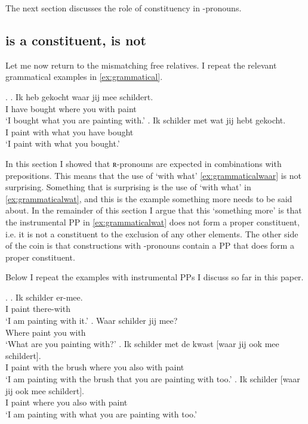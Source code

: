 \documentclass[12pt]{article}
\begin{document}
The next section discusses the role of constituency in -pronouns.


\subsection{ is a constituent,  is not}

Let me now return to the mismatching free relatives. I repeat the relevant grammatical examples in \ref{ex:grammatical}.

\ex.\label{ex:grammatical}
\ag. Ik heb gekocht waar jij mee schildert.\\
 I have bought where you with paint\\
 `I bought what you are painting with.'\label{ex:grammaticalwaar}
\bg. Ik schilder met wat jij hebt gekocht.\\
 I paint with what you have bought\\
 `I paint with what you bought.'\label{ex:grammaticalwat}

In this section I showed that ʀ-pronouns are expected in combinations with prepositions. This means that the use of  `with what' \ref{ex:grammaticalwaar} is not surprising. Something that is surprising is the use of  `with what' in \ref{ex:grammaticalwat}, and this is the example something more needs to be said about. In the remainder of this section I argue that this `something more' is that the instrumental PP in \ref{ex:grammaticalwat} does not form a proper constituent, i.e. it is not a constituent to the exclusion of any other elements. The other side of the coin is that constructions with -pronouns contain a PP that does form a proper constituent.

Below I repeat the examples with instrumental PPs I discuss so far in this paper.

\ex.
\ag. Ik schilder er-mee.\\
 I paint there-with\\
 `I am painting with it.'\label{ex:const1}
\bg. Waar schilder jij mee?\\
 Where paint you with\\
 `What are you painting with?'\label{ex:const2}
\bg. Ik schilder met de kwast [waar jij ook mee schildert].\\
 I paint with the brush where you also with paint\\
 `I am painting with the brush that you are painting with too.'\label{ex:const3}
\bg. Ik schilder [waar jij ook mee schildert].\\
 I paint where you also with paint\\
 `I am painting with what you are painting with too.'\label{ex:const4}
\end{document}
